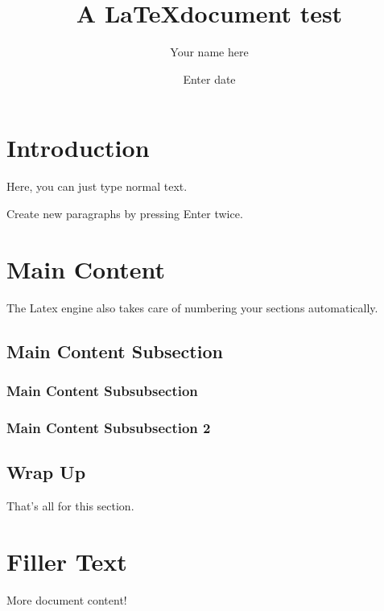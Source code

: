 \documentclass[11pt,twoside,a4paper]{article}
\author{Your name here}
\date{Enter date}
\title{A \LaTeX document test}
\begin{document}
\maketitle 
\newpage

\tableofcontents
\newpage

\section{Introduction}
Here, you can just type normal text.

Create new paragraphs by pressing Enter twice.
\newpage

\section{Main Content}
The Latex engine also takes care of numbering your sections automatically. 

    \subsection{Main Content Subsection}

        \subsubsection{Main Content Subsubsection}

        \subsubsection{Main Content Subsubsection 2}
        
    \subsection{Wrap Up}
    That's all for this section.


\section{Filler Text}
More document content!
\end{document}

